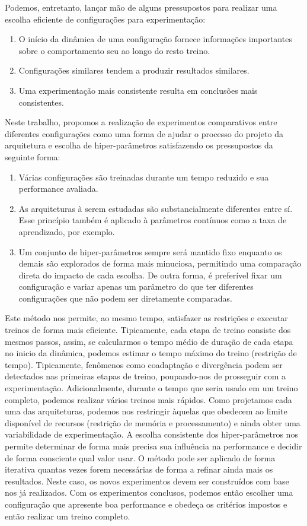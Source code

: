 Podemos, entretanto, lançar mão de alguns pressupostos para realizar uma escolha eficiente de configurações para experimentação:
\begin{enumerate}
	\item O início da dinâmica de uma configuração fornece informações importantes sobre o comportamento seu ao longo do resto treino.
	\item Configurações similares tendem a produzir resultados similares.
	\item Uma experimentação mais consistente resulta em conclusões mais consistentes.
\end{enumerate}
Neste trabalho, propomos a realização de experimentos comparativos entre diferentes configurações como uma forma de ajudar o processo do projeto da arquitetura e escolha de hiper-parâmetros satisfazendo os pressupostos da seguinte forma:
\begin{enumerate}
	\item Várias configurações são treinadas durante um tempo reduzido e sua performance avaliada.
	\item As arquiteturas à serem estudadas são substancialmente diferentes entre sí. Esse princípio também é aplicado à parâmetros contínuos como a taxa de aprendizado, por exemplo.
	\item Um conjunto de hiper-parâmetros sempre será mantido fixo enquanto os demais são explorados de forma mais minuciosa, permitindo uma comparação direta do impacto de cada escolha. De outra forma, é preferível fixar um configuração e variar apenas um parâmetro do que ter diferentes configurações que não podem ser diretamente comparadas.
\end{enumerate}

Este método nos permite, ao mesmo tempo, satisfazer as restrições e executar treinos de forma mais eficiente. Tipicamente, cada etapa de treino consiste dos mesmos passos, assim, se calcularmos o tempo médio de duração de cada etapa no inicio da dinâmica, podemos estimar o tempo máximo do treino (restrição de tempo). Tipicamente, fenômenos como coadaptação e divergência podem ser detectados nas primeiras etapas de treino, poupando-nos de prosseguir com a experimentação. Adicionalmente, durante o tempo que seria usado em um treino completo, podemos realizar vários treinos mais rápidos. Como projetamos cada uma das arquiteturas, podemos nos restringir àquelas que obedecem ao limite disponível de recursos (restrição de memória e processamento) e ainda obter uma variabilidade de experimentação. A escolha consistente dos hiper-parâmetros nos permite determinar de forma mais precisa sua influência na performance e decidir de forma consciente qual valor usar. O método pode ser aplicado de forma iterativa quantas vezes forem necessárias de forma a refinar ainda mais os resultados. Neste caso, os novos experimentos devem ser construídos com base nos já realizados. Com os experimentos conclusos, podemos então escolher uma configuração que apresente boa performance e obedeça os critérios impostos e então realizar um treino completo.

